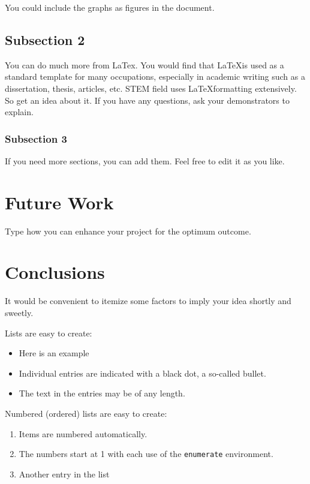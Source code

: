 \documentclass[11pt]{report}	%
\begin{document}
You could include the graphs as figures in the document. 

\section{Subsection 2} 

You can do much more from LaTex. You would find that \LaTeX is used as a standard template for many occupations, especially in academic writing such as a dissertation, thesis, articles, etc. STEM field uses \LaTeX formatting extensively. So get an idea about it. If you have any questions, ask your demonstrators to explain.

\subsection{Subsection 3} 

If you need more sections, you can add them. Feel free to edit it as you like.


\newpage
\chapter{Future Work}

Type how you can enhance your project for the optimum outcome.




\newpage
\chapter{Conclusions} 

It would be convenient to itemize some factors to imply your idea shortly and sweetly.

Lists are easy to create:
\begin{itemize}
  \item Here is an example
  \item Individual entries are indicated with a black dot, a so-called bullet.
  \item The text in the entries may be of any length.
\end{itemize}

Numbered (ordered) lists are easy to create:
\begin{enumerate}
  \item Items are numbered automatically.
  \item The numbers start at 1 with each use of the \texttt{enumerate} environment.
  \item Another entry in the list
\end{enumerate}
\end{document}
